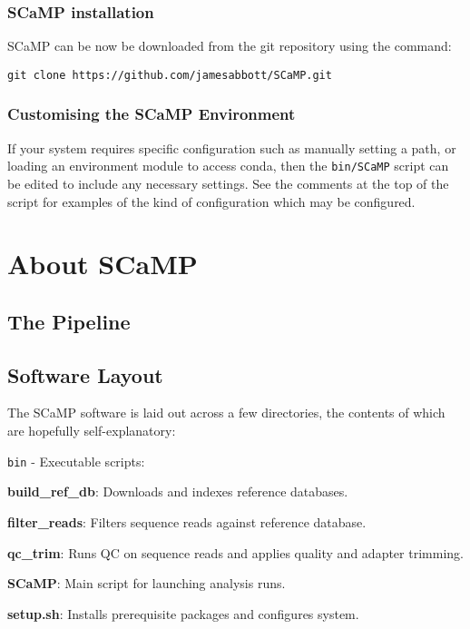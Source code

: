 \documentclass[a4paper,10pt]{article}
\newenvironment{tight_itemize}{
\begin{itemize}
  \setlength{\itemsep}{0pt}
  \setlength{\parskip}{0pt}
}{\end{itemize}}
\begin{document}
\subsubsection{SCaMP installation}

SCaMP can be now be downloaded from the git repository using the command:                                           

{\tt git clone https://github.com/jamesabbott/SCaMP.git}

\subsubsection{Customising the SCaMP Environment}

If your system requires specific configuration such as manually setting a path,
or loading an environment module to access conda, then the {\tt bin/SCaMP}
script can be edited to include any necessary settings. See the comments at the
top of the script for examples of the kind of configuration which may be
configured.

\section{About SCaMP}

\subsection{The Pipeline} \label{pipeline}


\subsection{Software Layout}

The SCaMP software is laid out across a few directories, the contents of which
are hopefully self-explanatory:

{\tt bin} - Executable scripts:
\begin{tight_itemize}
\item \textbf{build\_ref\_db}: Downloads and indexes reference databases.
\item \textbf{filter\_reads}: Filters sequence reads against reference database.
\item \textbf{qc\_trim}: Runs QC on sequence reads and applies quality and adapter trimming.
\item \textbf{SCaMP}: Main script for launching analysis runs.
\item \textbf{setup.sh}: Installs prerequisite packages and configures system.
\end{tight_itemize}
\end{document}

